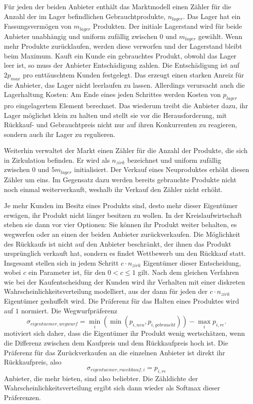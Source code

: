 Für jeden der beiden Anbieter enthält das Marktmodell einen Zähler für die Anzahl der im Lager befindlichen Gebrauchtprodukte, $n_{lager}$.
Das Lager hat ein Fassungsvermögen von $m_{lager}$ Produkten.
Der initiale Lagerstand wird für beide Anbieter unabhängig und uniform zufällig zwischen $0$ und $m_{lager}$ gewählt.
Wenn mehr Produkte zurücklaufen, werden diese verworfen und der Lagerstand bleibt beim Maximum.
Kauft ein Kunde ein gebrauchtes Produkt, obwohl das Lager leer ist, so muss der Anbieter Entschädigung zahlen.
Die Entschädigung ist auf $2 p_{max}$ pro enttäuschtem Kunden festgelegt.
Das erzeugt einen starken Anreiz für die Anbieter, das Lager nicht leerlaufen zu lassen.
Allerdings verursacht auch die Lagerhaltung Kosten: Am Ende eines jeden Schrittes werden Kosten von $p_{lager}$ pro eingelagertem Element berechnet.
Das wiederum treibt die Anbieter dazu, ihr Lager möglichst klein zu halten und stellt sie vor die Herausforderung, mit Rückkauf- und Gebrauchtpreis nicht nur auf ihren Konkurrenten zu reagieren, sondern auch ihr Lager zu regulieren.

Weiterhin verwaltet der Markt einen Zähler für die Anzahl der Produkte, die sich in Zirkulation befinden.
Er wird als $n_{zirk}$ bezeichnet und uniform zufällig zwischen $0$ und $5 m_{lager}$ initialisiert.
Der Verkauf eines Neuproduktes erhöht diesen Zähler um eins.
Im Gegensatz dazu werden bereits gebrauchte Produkte nicht noch einmal weiterverkauft, weshalb ihr Verkauf den Zähler nicht erhöht.

Je mehr Kunden im Besitz eines Produkts sind, desto mehr dieser Eigentümer erwägen, ihr Produkt nicht länger besitzen zu wollen.
In der Kreislaufwirtschaft stehen sie dann vor vier Optionen:
Sie können ihr Produkt weiter behalten, es wegwerfen oder an einen der beiden Anbieter zurückverkaufen.
Die Möglichkeit des Rückkaufs ist nicht auf den Anbieter beschränkt, der ihnen das Produkt ursprünglich verkauft hat, sondern es findet Wettbewerb um den Rückkauf statt.
Insgesamt stellen sich in jedem Schritt $c \cdot n_{zirk}$ Eigentümer dieser Entscheidung, wobei $c$ ein Parameter ist, für den $0 < c \leq 1$ gilt.
Nach dem gleichen Verfahren wie bei der Kaufentscheidung der Kunden wird ihr Verhalten mit einer diskreten Wahrscheinlichkeitsverteilung modelliert, aus der dann für jeden der $c \cdot n_{zirk}$ Eigentümer geshuffelt wird.
Die Präferenz für das Halten eines Produktes wird auf $1$ normiert.
Die Wegwurfpräferenz
\begin{equation}
	\sigma_{eigentuemer, wegwurf} = \min_{i}{\left(\min{(p_{i, neu}, p_{i, gebraucht})}\right)} - \max_{i}{p_{i, re}}.
\end{equation}
motiviert sich daher, dass die Eigentümer ihr Produkt wenig wertschätzen, wenn die Differenz zwischen dem Kaufpreis und dem Rückkaufpreis hoch ist.
Die Präferenz für das Zurückverkaufen an die einzelnen Anbieter ist direkt ihr Rückkaufpreis, also
\begin{equation}
	\sigma_{eigentuemer, rueckkauf, i} = p_{i, re}
\end{equation}
Anbieter, die mehr bieten, sind also beliebter.
Die Zähldichte der Wahrscheinlichkeitsverteilung ergibt sich dann wieder als Softmax dieser Präferenzen.

